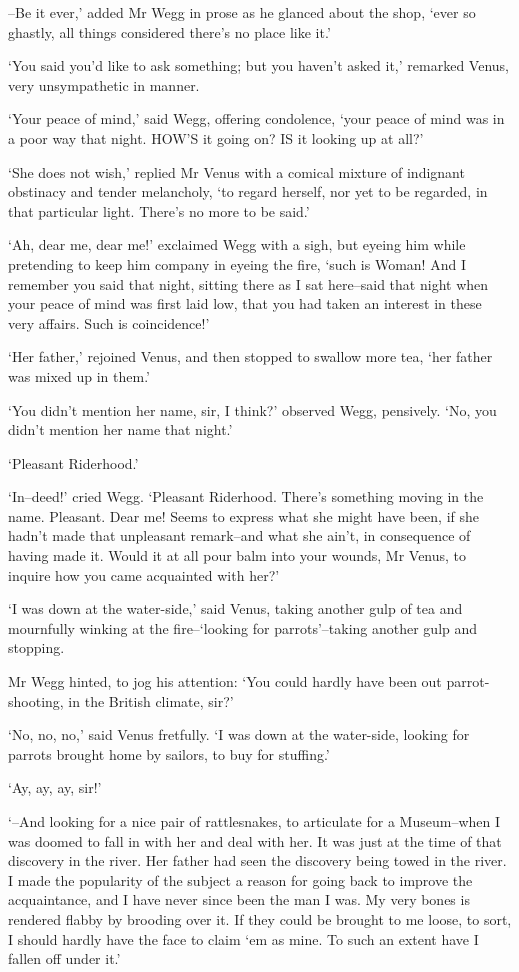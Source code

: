 --Be it ever,’ added Mr Wegg in prose as he glanced about the shop,
‘ever so ghastly, all things considered there’s no place like it.’

‘You said you’d like to ask something; but you haven’t asked it,’
remarked Venus, very unsympathetic in manner.

‘Your peace of mind,’ said Wegg, offering condolence, ‘your peace of
mind was in a poor way that night. HOW’S it going on? IS it looking up
at all?’

‘She does not wish,’ replied Mr Venus with a comical mixture of
indignant obstinacy and tender melancholy, ‘to regard herself, nor yet
to be regarded, in that particular light. There’s no more to be said.’

‘Ah, dear me, dear me!’ exclaimed Wegg with a sigh, but eyeing him while
pretending to keep him company in eyeing the fire, ‘such is Woman! And
I remember you said that night, sitting there as I sat here--said that
night when your peace of mind was first laid low, that you had taken an
interest in these very affairs. Such is coincidence!’

‘Her father,’ rejoined Venus, and then stopped to swallow more tea, ‘her
father was mixed up in them.’

‘You didn’t mention her name, sir, I think?’ observed Wegg, pensively.
‘No, you didn’t mention her name that night.’

‘Pleasant Riderhood.’

‘In--deed!’ cried Wegg. ‘Pleasant Riderhood. There’s something moving in
the name. Pleasant. Dear me! Seems to express what she might have
been, if she hadn’t made that unpleasant remark--and what she ain’t,
in consequence of having made it. Would it at all pour balm into your
wounds, Mr Venus, to inquire how you came acquainted with her?’

‘I was down at the water-side,’ said Venus, taking another gulp of
tea and mournfully winking at the fire--‘looking for parrots’--taking
another gulp and stopping.

Mr Wegg hinted, to jog his attention: ‘You could hardly have been out
parrot-shooting, in the British climate, sir?’

‘No, no, no,’ said Venus fretfully. ‘I was down at the water-side,
looking for parrots brought home by sailors, to buy for stuffing.’

‘Ay, ay, ay, sir!’

‘--And looking for a nice pair of rattlesnakes, to articulate for a
Museum--when I was doomed to fall in with her and deal with her. It was
just at the time of that discovery in the river. Her father had seen the
discovery being towed in the river. I made the popularity of the subject
a reason for going back to improve the acquaintance, and I have never
since been the man I was. My very bones is rendered flabby by brooding
over it. If they could be brought to me loose, to sort, I should hardly
have the face to claim ‘em as mine. To such an extent have I fallen off
under it.’

